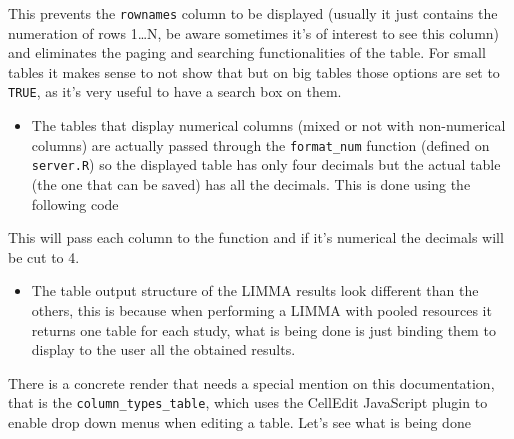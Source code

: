 \documentclass[
]{book}
\newenvironment{Shaded}{\begin{snugshade}}{\end{snugshade}}
\newcommand{\FunctionTok}[1]{\textcolor[rgb]{0.00,0.00,0.00}{#1}}
\newcommand{\NormalTok}[1]{#1}
\newcommand{\SpecialCharTok}[1]{\textcolor[rgb]{0.00,0.00,0.00}{#1}}
\providecommand{\tightlist}{%
  \setlength{\itemsep}{0pt}\setlength{\parskip}{0pt}}
\begin{document}
This prevents the \texttt{rownames} column to be displayed (usually it just contains the numeration of rows 1\ldots N, be aware sometimes it's of interest to see this column) and eliminates the paging and searching functionalities of the table. For small tables it makes sense to not show that but on big tables those options are set to \texttt{TRUE}, as it's very useful to have a search box on them.

\begin{itemize}
\tightlist
\item
  The tables that display numerical columns (mixed or not with non-numerical columns) are actually passed through the \texttt{format\_num} function (defined on \texttt{server.R}) so the displayed table has only four decimals but the actual table (the one that can be saved) has all the decimals. This is done using the following code
\end{itemize}

\begin{Shaded}
\end{Shaded}

This will pass each column to the function and if it's numerical the decimals will be cut to 4.

\begin{itemize}
\tightlist
\item
  The table output structure of the LIMMA results look different than the others, this is because when performing a LIMMA with pooled resources it returns one table for each study, what is being done is just binding them to display to the user all the obtained results.
\end{itemize}

There is a concrete render that needs a special mention on this documentation, that is the \texttt{column\_types\_table}, which uses the CellEdit JavaScript plugin to enable drop down menus when editing a table. Let's see what is being done
\end{document}
